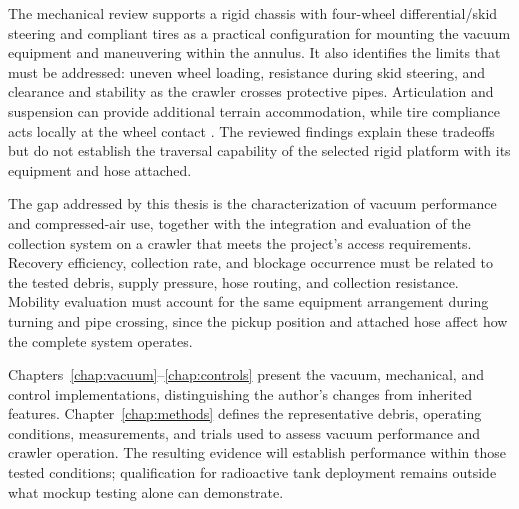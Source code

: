 The mechanical review supports a rigid chassis with four-wheel differential/skid steering and compliant tires as a practical configuration for mounting the vacuum equipment and maneuvering within the annulus. It also identifies the limits that must be addressed: uneven wheel loading, resistance during skid steering, and clearance and stability as the crawler crosses protective pipes. Articulation and suspension can provide additional terrain accommodation, while tire compliance acts locally at the wheel contact \citep{bouton2023Marcel,wilhelm2007StepClimbing,mandow2007Kinematics}. The reviewed findings explain these tradeoffs but do not establish the traversal capability of the selected rigid platform with its equipment and hose attached.

The gap addressed by this thesis is the characterization of vacuum performance and compressed-air use, together with the integration and evaluation of the collection system on a crawler that meets the project's access requirements. Recovery efficiency, collection rate, and blockage occurrence must be related to the tested debris, supply pressure, hose routing, and collection resistance. Mobility evaluation must account for the same equipment arrangement during turning and pipe crossing, since the pickup position and attached hose affect how the complete system operates.

Chapters~\ref{chap:vacuum}--\ref{chap:controls} present the vacuum, mechanical, and control implementations, distinguishing the author's changes from inherited features. Chapter~\ref{chap:methods} defines the representative debris, operating conditions, measurements, and trials used to assess vacuum performance and crawler operation. The resulting evidence will establish performance within those tested conditions; qualification for radioactive tank deployment remains outside what mockup testing alone can demonstrate.
